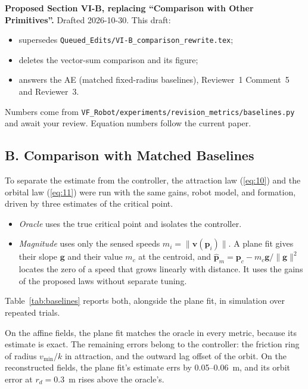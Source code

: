 \documentclass[10pt]{article}
\begin{document}
\noindent\textbf{Proposed Section VI-B, replacing ``Comparison with Other Primitives''.} Drafted 2026-10-30. This draft:
\begin{itemize}
\item supersedes \texttt{Queued\_Edits/VI-B\_comparison\_rewrite.tex};
\item deletes the vector-sum comparison and its figure;
\item answers the AE (matched fixed-radius baselines), Reviewer~1 Comment~5 and Reviewer~3.
\end{itemize}
Numbers come from \texttt{VF\_Robot/experiments/revision\_metrics/baselines.py} and await your review. Equation numbers follow the current paper.

\subsection*{B. Comparison with Matched Baselines}

To separate the estimate from the controller, the attraction law (\ref{eq:10}) and the orbital law (\ref{eq:11}) were run with the same gains, robot model, and formation, driven by three estimates of the critical point.
\begin{itemize}
\item \emph{Oracle} uses the true critical point and isolates the controller.
\item \emph{Magnitude} uses only the sensed speeds $m_i = \|\mathbf{v}(\mathbf{p}_i)\|$. A plane fit gives their slope $\mathbf{g}$ and their value $m_c$ at the centroid, and $\hat{\mathbf{p}}_m = \mathbf{p}_c - m_c\mathbf{g}/\|\mathbf{g}\|^2$ locates the zero of a speed that grows linearly with distance. It uses the gains of the proposed laws without separate tuning.
\end{itemize}
Table~\ref{tab:baselines} reports both, alongside the plane fit, in simulation over repeated trials.

On the affine fields, the plane fit matches the oracle in every metric, because its estimate is exact. The remaining errors belong to the controller: the friction ring of radius $v_{\min}/k$ in attraction, and the outward lag offset of the orbit. On the reconstructed fields, the plane fit's estimate errs by 0.05--0.06~m, and its orbit error at $r_d = 0.3$~m rises above the oracle's.
\end{document}
